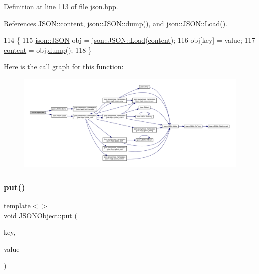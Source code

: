 Definition at line 113 of file json.\+hpp.



References J\+S\+O\+N\+::content, json\+::\+J\+S\+O\+N\+::dump(), and json\+::\+J\+S\+O\+N\+::\+Load().


\begin{DoxyCode}
114 \{
115     \mbox{\hyperlink{classjson_1_1_j_s_o_n}{json::JSON}} obj = \mbox{\hyperlink{classjson_1_1_j_s_o_n_a799ab1cc68cb6e2a41ec948a9a2ecc37}{json::JSON::Load}}(\mbox{\hyperlink{class_j_s_o_n_ad1ace77234b963a2994178ce7f76a181}{content}});
116     obj[key] = value;
117     \mbox{\hyperlink{class_j_s_o_n_ad1ace77234b963a2994178ce7f76a181}{content}} = obj.\mbox{\hyperlink{classjson_1_1_j_s_o_n_acb99af0df2045a504f6bbc08bf5c4990}{dump}}();
118 \}
\end{DoxyCode}
Here is the call graph for this function\+:
\nopagebreak
\begin{figure}[H]
\begin{center}
\leavevmode
\includegraphics[width=350pt]{class_j_s_o_n_object_abe961a3b81398975838f4c51a694c81a_cgraph}
\end{center}
\end{figure}
\mbox{\label{class_j_s_o_n_object_a8d8c154a5eec2113eafca987d372ee98}} 
\subsubsection{\texorpdfstring{put()}{put()}\hspace{0.1cm}{\footnotesize\ttfamily [2/4]}}
{\footnotesize\ttfamily template$<$$>$ \\
void J\+S\+O\+N\+Object\+::put (\begin{DoxyParamCaption}\item[{std\+::string}]{key,  }\item[{\mbox{\hyperlink{class_j_s_o_n}{J\+S\+ON}}}]{value }\end{DoxyParamCaption})\hspace{0.3cm}{\ttfamily [inline]}}

